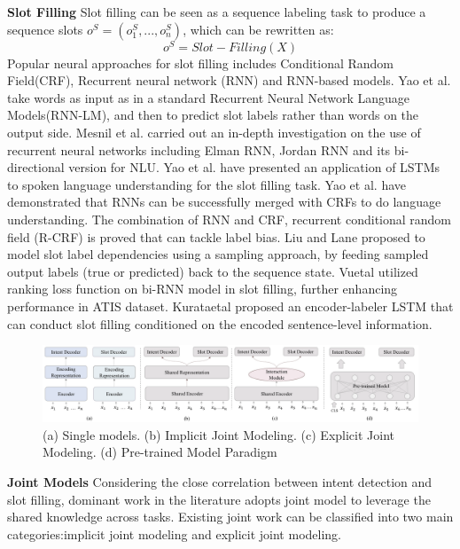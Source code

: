 \documentclass[10pt,twocolumn,letterpaper]{article}
\begin{document}
\textbf{Slot Filling}
Slot filling can be seen as a sequence labeling task to produce a sequence slots $o^S = (o_1^S,...,o_n^S)$, which can be rewritten as:
\begin{equation}
    o^S = Slot-Filling(X)
    \label{eq:SF}
\end{equation}
Popular neural approaches for slot filling includes  Conditional Random Field(CRF),  Recurrent  neural  network  (RNN)  and  RNN-based  models. 
Yao et al. \cite{yao2013recurrent} take words as input as in a standard Recurrent Neural Network Language Models(RNN-LM), and then to predict slot labels rather than words on the output side. Mesnil et al. \cite{mesnil2013investigation} carried out an in-depth investigation on the use of recurrent neural networks including Elman RNN, Jordan RNN and its bi-directional version for NLU. Yao et al. \cite{yao2014spoken} have presented an application of LSTMs to spoken language understanding for the slot filling task. Yao et al.  \cite{yao2014recurrent} have demonstrated that RNNs can be successfully merged with CRFs to do language understanding. The combination of RNN and CRF, recurrent conditional random field (R-CRF) is proved that can tackle label bias. Liu and Lane \cite{liu2015recurrent} proposed to model slot label dependencies using a sampling approach, by feeding sampled output labels (true or predicted) back to the sequence state. Vuetal \cite{vu2016bi} utilized ranking loss function on bi-RNN model in slot filling, further enhancing performance in ATIS dataset. Kurataetal \cite{kurata2016leveraging} proposed an encoder-labeler LSTM that can conduct slot filling conditioned on the encoded sentence-level information.
\begin{figure}
    \centering
    \includegraphics[scale=0.4]{NLUframework.png}
    \caption{(a) Single models. (b) Implicit Joint Modeling. (c) Explicit Joint Modeling. (d) Pre-trained Model Paradigm}
    \label{fig:NLUframework}
\end{figure}
\textbf{Joint Models}
Considering the close correlation between intent detection and slot filling, dominant work in the literature adopts joint model to leverage the shared knowledge across tasks. Existing joint work can be classified into two main categories:implicit joint modeling and explicit joint modeling. 
\end{document}
